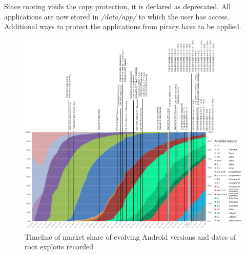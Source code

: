 \newline
Since rooting voids the copy protection, it is declared as deprecated.
All applications are now stored in \textit{/data/app/} to which the user has access.
Additional ways to protect the applications from piracy have to be applied.
\newpage
\begin{figure}[h]
    \centering
    \includegraphics[width=1\textwidth]{data/timeline.png}
    \caption{Timeline of market share of evolving Android versions and dates of root exploits recorded \cite{distributionRoot} \cite{androidVulnerabilities} \cite{cveAndroidPriv} \cite{cveDetails}}
    \label{fig:root}
\end{figure}
